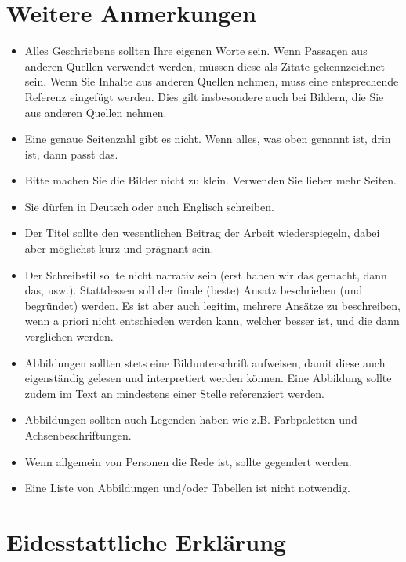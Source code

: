 \documentclass{article}
\begin{document}
\section*{Weitere Anmerkungen}
\begin{itemize}
\item Alles Geschriebene sollten Ihre eigenen Worte sein. Wenn Passagen aus anderen Quellen verwendet werden, müssen diese als Zitate gekennzeichnet sein. Wenn Sie Inhalte aus anderen Quellen nehmen, muss eine entsprechende Referenz eingefügt werden. Dies gilt insbesondere auch bei Bildern, die Sie aus anderen Quellen nehmen.
\item Eine genaue Seitenzahl gibt es nicht. Wenn alles, was oben genannt ist, drin ist, dann passt das.
\item Bitte machen Sie die Bilder nicht zu klein. Verwenden Sie lieber mehr Seiten.
\item Sie dürfen in Deutsch oder auch Englisch schreiben.
\item Der Titel sollte den wesentlichen Beitrag der Arbeit wiederspiegeln, dabei aber möglichst kurz und prägnant sein.
\item Der Schreibstil sollte nicht narrativ sein (erst haben wir das gemacht, dann das, usw.). Stattdessen soll der finale (beste) Ansatz beschrieben (und begründet) werden. Es ist aber auch legitim, mehrere Ansätze zu beschreiben, wenn a priori nicht entschieden werden kann, welcher besser ist, und die dann verglichen werden.
\item Abbildungen sollten stets eine Bildunterschrift aufweisen, damit diese auch eigenständig gelesen und interpretiert werden können.
Eine Abbildung sollte zudem im Text an mindestens einer Stelle referenziert werden.
\item Abbildungen sollten auch Legenden haben wie z.B. Farbpaletten und Achsenbeschriftungen.
\item Wenn allgemein von Personen die Rede ist, sollte gegendert werden.
\item Eine Liste von Abbildungen und/oder Tabellen ist nicht notwendig.
\end{itemize}




\newpage
\section*{Eidesstattliche Erklärung}

\end{document}
